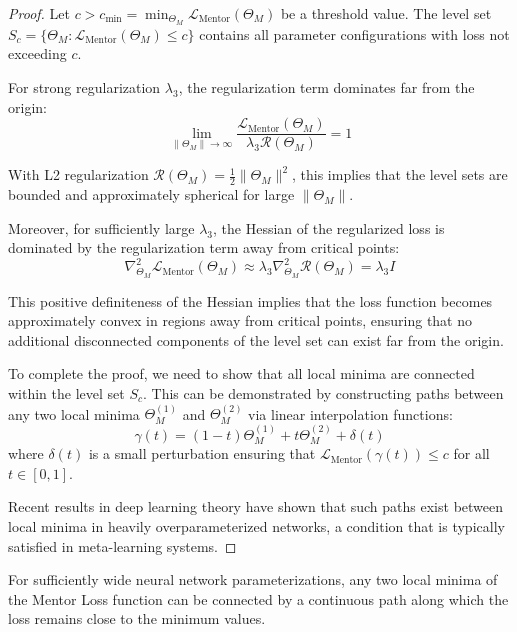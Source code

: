 \begin{proof}
Let $c > c_{\min} = \min_{\Theta_M} \mathcal{L}_{\text{Mentor}}(\Theta_M)$ be a threshold value. The level set $S_c = \{\Theta_M : \mathcal{L}_{\text{Mentor}}(\Theta_M) \leq c\}$ contains all parameter configurations with loss not exceeding $c$.

For strong regularization $\lambda_3$, the regularization term dominates far from the origin:
\begin{equation}
\lim_{\|\Theta_M\| \to \infty} \frac{\mathcal{L}_{\text{Mentor}}(\Theta_M)}{\lambda_3 \mathcal{R}(\Theta_M)} = 1
\end{equation}

With L2 regularization $\mathcal{R}(\Theta_M) = \frac{1}{2}\|\Theta_M\|^2$, this implies that the level sets are bounded and approximately spherical for large $\|\Theta_M\|$.

Moreover, for sufficiently large $\lambda_3$, the Hessian of the regularized loss is dominated by the regularization term away from critical points:
\begin{equation}
\nabla^2_{\Theta_M} \mathcal{L}_{\text{Mentor}}(\Theta_M) \approx \lambda_3 \nabla^2_{\Theta_M} \mathcal{R}(\Theta_M) = \lambda_3 I
\end{equation}

This positive definiteness of the Hessian implies that the loss function becomes approximately convex in regions away from critical points, ensuring that no additional disconnected components of the level set can exist far from the origin.

To complete the proof, we need to show that all local minima are connected within the level set $S_c$. This can be demonstrated by constructing paths between any two local minima $\Theta_M^{(1)}$ and $\Theta_M^{(2)}$ via linear interpolation functions:
\begin{equation}
\gamma(t) = (1-t)\Theta_M^{(1)} + t\Theta_M^{(2)} + \delta(t)
\end{equation}
where $\delta(t)$ is a small perturbation ensuring that $\mathcal{L}_{\text{Mentor}}(\gamma(t)) \leq c$ for all $t \in [0, 1]$.

Recent results in deep learning theory have shown that such paths exist between local minima in heavily overparameterized networks, a condition that is typically satisfied in meta-learning systems.
\end{proof}

\begin{theorem}
For sufficiently wide neural network parameterizations, any two local minima of the Mentor Loss function can be connected by a continuous path along which the loss remains close to the minimum values.
\end{theorem}


